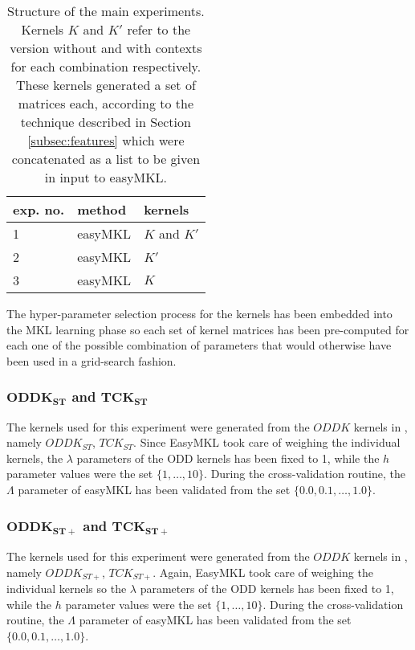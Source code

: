 \begin{table}[ht]
    \centering
    \begin{tabular}{|l|l|l|}
        \hline
        exp. no. & method & kernels \\
        \hline
        1 & easyMKL & $K$ and $K'$ \\
        \hline
        2 & easyMKL & $K'$ \\
        \hline
        3 & easyMKL & $K$ \\
        \hline
    \end{tabular}
    \caption{Structure of the main experiments. Kernels $K$ and $K'$ refer
    to the version without and with contexts for each combination respectively.
    These kernels generated a set of matrices each, according to the technique
    described in Section \ref{subsec:features} which were concatenated as a list
    to be given in input to easyMKL.}
    \label{table:structure}
\end{table}

The hyper-parameter selection process for the kernels has been embedded
into the MKL learning phase so each set of kernel matrices has been
pre-computed for each one of the possible combination of parameters that would
otherwise have been used in a grid-search fashion.

\subsubsection[$ODDK_{ST}$ and $TCK_{ST}$]{$\boldsymbol{ODDK_{ST}}$ and $\boldsymbol{TCK_{ST}}$}
The kernels used for this experiment were generated from the $ODDK$ kernels
in \cite{odd, contexts}, namely $ODDK_{ST}$, $TCK_{ST}$.
Since EasyMKL took care of weighing the individual kernels, the $\lambda$
parameters of the ODD kernels has been fixed to 1, while the $h$ parameter
values were the set $\{1,\dots,10\}$.
During the cross-validation routine, the $\Lambda$ parameter of easyMKL has been
validated from the set $\{0.0, 0.1,\dots,1.0\}$.

\subsubsection[$ODDK_{ST+}$ and $TCK_{ST+}$]{$\boldsymbol{ODDK_{ST+}}$ and $\boldsymbol{TCK_{ST+}}$}
The kernels used for this experiment were generated from the $ODDK$ kernels
in \cite{stplus, rtesselli}, namely $ODDK_{ST+}$, $TCK_{ST+}$.
Again, EasyMKL took care of weighing the individual kernels so the $\lambda$
parameters of the ODD kernels has been fixed to 1, while the $h$ parameter
values were the set $\{1,\dots,10\}$.
During the cross-validation routine, the $\Lambda$ parameter of easyMKL has been
validated from the set $\{0.0, 0.1,\dots,1.0\}$.

